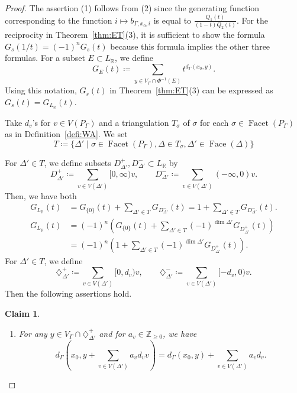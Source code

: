 \documentclass[10pt,a4paper]{amsart}
\theoremstyle{plain}
\newtheorem{claim}[cdrthm]{Claim}
\theoremstyle{definition}
\theoremstyle{remark}
\begin{document}
\begin{proof}
The assertion (1) follows from (2) since the generating function corresponding to the function $i \mapsto b_{\Gamma, x_0, i}$ is equal to $\frac{Q_1(t)}{(1-t)Q_2(t)}$. 
For the reciprocity in Theorem~\ref{thm:ET}(3), it is sufficient to show the formula 
$G_s(1/t) = (-1)^n G_s(t)$ because this formula implies the other three formulas. 
For a subset $E \subset L_{\mathbb{R}}$, we define 
\[
G_E(t) \coloneqq  \sum _{y \in V_{\Gamma} \cap \Phi ^{-1}(E)} t^{d_{\Gamma}(x_0, y)}.  
\]
Using this notation, $G_s(t)$ in Theorem~\ref{thm:ET}(3) can be expressed as 
$G_s(t) = G_{L_{\mathbb{R}}} (t)$. 

Take $d_v$'s for $v \in V(P_{\Gamma})$ and a triangulation $T_{\sigma}$ of $\sigma$ for each 
$\sigma \in \operatorname{Facet}(P_{\Gamma})$ as in Definition~\ref{defi:WA}. 
We set 
\[
T \coloneqq  \{ \Delta' \mid \sigma \in \operatorname{Facet}(P_{\Gamma}), 
\Delta \in T_{\sigma}, \Delta ' \in \operatorname{Face}(\Delta) \}
\]

For $\Delta ' \in T$, 
we define subsets $D^+ _{\Delta '}, D^- _{\Delta '}\subset L_{\mathbb{R}}$ by
\[
D^+ _{\Delta '} \coloneqq  \sum _{v \in V(\Delta ')} [0, \infty) v, \qquad 
D^- _{\Delta '} \coloneqq  \sum _{v \in V(\Delta ')} (- \infty, 0) v. 
\]
Then, we have both
\begin{align*}
G_{L_{\mathbb{R}}}(t) \tag{$\spadesuit$}
&= G_{\{ 0 \}}(t) + \sum_{\Delta ' \in T} G_{D^{-}_{\Delta '}}(t) 
= 1 + \sum_{\Delta ' \in T} G_{D^{-}_{\Delta '}}(t). \\ 
G_{L_{\mathbb{R}}}(t) 
&= (-1)^n \left( G_{\{ 0 \}}(t) 
+ \sum_{\Delta ' \in T} (-1)^{\dim \Delta '} G_{D^{+}_{\Delta '}}(t) \right)\\
&= (-1)^n \left( 1 + \sum_{\Delta ' \in T} (-1)^{\dim \Delta '} G_{D^{+}_{\Delta '}}(t) \right). 
\end{align*}
For $\Delta ' \in T$, we define 
\[
\diamondsuit^+ _{\Delta '} \coloneqq  \sum _{v \in V(\Delta ')} [0, d_v) v, \qquad 
\diamondsuit^- _{\Delta '} \coloneqq  \sum _{v \in V(\Delta ')} [-d_v, 0) v. 
\]
Then the following assertions hold. 
\begin{claim}\label{claim:diamond}
\begin{enumerate}
\item 
For any $y \in V_{\Gamma} \cap \diamondsuit^+ _{\Delta '}$
and for $a_v \in \mathbb{Z}_{\ge 0}$, 
we have 
\[
d_{\Gamma} \left( x_0, y + \sum _{v \in V(\Delta ')} a_v d_v v \right) 
= d_{\Gamma} (x_0, y) + \sum _{v \in V(\Delta ')} a_v d_v. 
\]


\end{enumerate}
\end{claim}
\end{proof}
\end{document}
